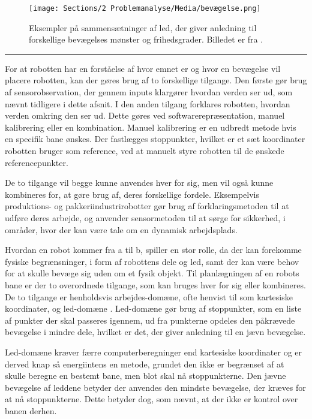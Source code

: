\begin{figure} [H]
    \centering
    \texttt{[image: Sections/2 Problemanalyse/Media/bevægelse.png]}
    \caption{Eksempler på sammensætninger af led, der giver anledning til forskellige bevægelses mønster og frihedsgrader. Billedet er fra \parencite{Niku2020IntroductionApplications}.}
    \label{fig: Sammensætniger af led}
\end{figure} \plainbreak{-0.5}

For at robotten har en forståelse af hvor emnet er og hvor en bevægelse vil placere robotten, kan der gøres brug af to forskellige tilgange. Den første gør brug af sensorobservation, der gennem inputs klargører hvordan verden ser ud, som nævnt tidligere i dette afsnit. I den anden tilgang forklares robotten, hvordan verden omkring den ser ud. Dette gøres ved softwarerepræsentation, manuel kalibrering eller en kombination. Manuel kalibrering er en udbredt metode hvis en specifik bane ønskes. Der fastlægges stoppunkter, hvilket er et sæt koordinater robotten bruger som reference, ved at manuelt styre robotten til de ønskede referencepunkter.

De to tilgange vil begge kunne anvendes hver for sig, men vil også kunne kombineres for, at gøre brug af, deres forskellige fordele. Eksempelvis produktions- og pakkeriindustrirobotter gør brug af forklaringsmetoden til at udføre deres arbejde, og anvender sensormetoden til at sørge for sikkerhed, i områder, hvor der kan være tale om en dynamisk arbejdsplads.


Hvordan en robot kommer fra a til b, spiller en stor rolle, da der kan forekomme fysiske begrænsninger, i form af robottens dele og led, samt der kan være behov for at skulle bevæge sig uden om et fysik objekt. Til planlægningen af en robots bane er der to overordnede tilgange, som kan bruges hver for sig eller kombineres. De to tilgange er henholdsvis arbejdes-domæne, ofte henvist til som kartesiske koordinater, og led-domæne \parencite{Castro2019TrajectoryManipulators}. Led-domæne gør brug af stoppunkter, som en liste af punkter der skal passeres igennem, ud fra punkterne opdeles den påkrævede bevægelse i mindre dele, hvilket er det, der giver anledning til en jævn bevægelse.

Led-domæne kræver færre computerberegninger end kartesiske koordinater og er derved knap så energiintens en metode, grundet den ikke er begrænset af at skulle beregne en bestemt bane, men blot skal nå stoppunkterne. Den jævne bevægelse af leddene betyder der anvendes den mindste bevægelse, der kræves for at nå stoppunkterne. Dette betyder dog, som nævnt, at der ikke er kontrol over banen derhen.

